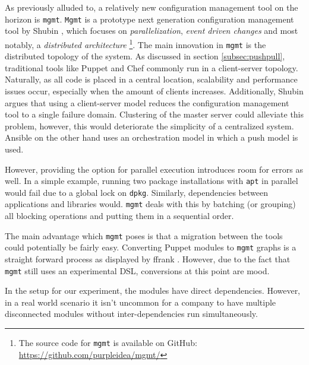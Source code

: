 As previously alluded to, a relatively new configuration management tool on the horizon is \texttt{mgmt}. \texttt{Mgmt} is a prototype next generation configuration management tool by Shubin \cite{shubin2016}, which focuses on \textit{parallelization}, \textit{event driven changes} and most notably, a \textit{distributed architecture} \footnote{The source code for \texttt{mgmt} is available on GitHub: \url{https://github.com/purpleidea/mgmt/}}. The main innovation in \texttt{mgmt} is the distributed topology of the system. As discussed in section \ref{subsec:pushpull}, traditional tools like Puppet and Chef commonly run in a client-server topology. Naturally, as all code is placed in a central location, scalability and performance issues occur, especially when the amount of clients increases. Additionally, Shubin argues that using a client-server model reduces the configuration management tool to a single failure domain. Clustering of the master server could alleviate this problem, however, this would deteriorate the simplicity of a centralized system. Ansible on the other hand uses an orchestration model in which a push model is used.
 
However, providing the option for parallel execution introduces room for errors as well. In a simple example, running two package installations with \texttt{apt} in parallel would fail due to a global lock on \texttt{dpkg}. Similarly, dependencies between applications and libraries would. \texttt{mgmt} deals with this by batching (or grouping) all blocking operations and putting them in a sequential order. 

The main advantage which \texttt{mgmt} poses is that a migration between the tools could potentially be fairly easy. Converting Puppet modules to \texttt{mgmt} graphs is a straight forward process as displayed by ffrank \cite{}. However, due to the fact that \texttt{mgmt} still uses an experimental DSL, conversions at this point are mood. 


In the setup for our experiment, the modules have direct dependencies. However, in a real world scenario it isn't uncommon for a company to have multiple disconnected modules without inter-dependencies run simultaneously. 
